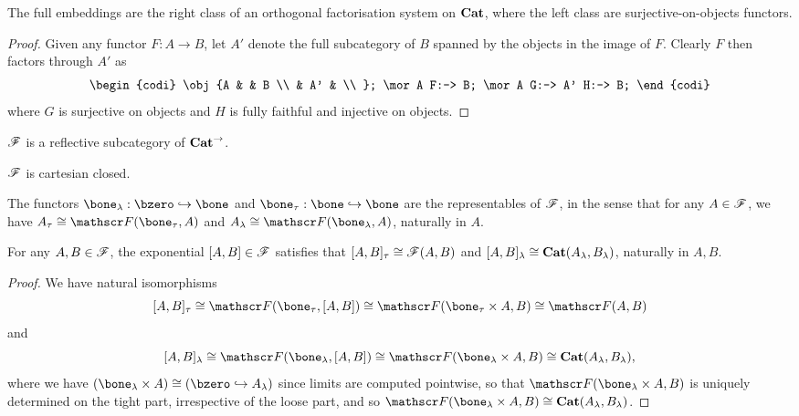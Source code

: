 \documentclass[../thesis.tex]{subfiles}
\begin{document}
  \begin{lemma}
    The full embeddings are the right class of an orthogonal factorisation system on ${\mathbf{Cat}}$, where
    the left class are surjective-on-objects functors.
  \end{lemma}
  \begin{proof}
    Given any functor $F : A \to B$, let $A'$ denote the full subcategory of $B$ spanned by the
    objects in the image of $F$. Clearly $F$ then factors through $A'$ as
    \[\begin{codi}
      \obj {A & & B \\
            & A' & \\ };
      \mor A F:-> B;
      \mor A G:-> A' H:-> B;
    \end{codi}\]
    where $G$ is surjective on objects and $H$ is fully faithful and injective on objects.
  \end{proof}

  \begin{corollary}
    ${\mathscr{F}}$ is a reflective subcategory of ${\mathbf{Cat}}^\to$.
  \end{corollary}

  \begin{corollary}
    ${\mathscr{F}}$ is cartesian closed.
  \end{corollary}

  \begin{lemma}
    The functors $\bone_\lambda : \bzero \into \bone$ and $\bone_\tau : \bone \into \bone$ are the
    representables of ${\mathscr{F}}$, in the sense that for any $A \in {\mathscr{F}}$, we have $A_\tau \cong \cF(\bone_%
    \tau, A)$ and $A_\lambda
    \cong \cF(\bone_\lambda, A)$, naturally in $A$.
  \end{lemma}

  \begin{corollary}
    For any $A, B \in {\mathscr{F}}$, the exponential $[A,B] \in {\mathscr{F}}$ satisfies that $[A,B]_\tau \cong {\mathscr{F}}(A,B)
    $ and $[A,B]_\lambda \cong {\mathbf{Cat}}(A_\lambda, B_\lambda)$, naturally in $A,B$.
  \end{corollary}
  \begin{proof}
    We have natural isomorphisms
    \[[A,B]_\tau \cong \cF(\bone_\tau, [A,B]) \cong \cF(\bone_\tau \times A, B) \cong \cF(A,B)\]
    and
    \[[A,B]_\lambda \cong \cF(\bone_\lambda, [A,B]) \cong \cF(\bone_\lambda \times A, B) \cong
    \Cat(A_\lambda, B_\lambda),\]
    where we have $(\bone_\lambda \times A) \cong (\bzero \into A_\lambda)$ since limits are computed
    pointwise, so that $\cF(\bone_\lambda \times A, B)$ is uniquely determined on the tight part,
    irrespective of the loose part, and so $\cF(\bone_\lambda \times A, B) \cong \Cat(A_\lambda, B_%
    \lambda)$.
  \end{proof}
  
\end{document}
